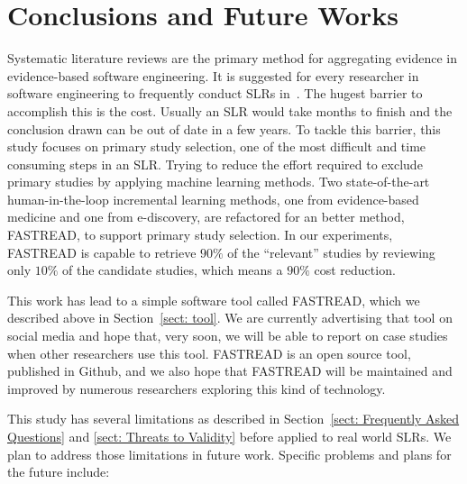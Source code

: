 \documentclass[final,twocolumn,5p]{elsarticle}
\theoremstyle{break}
\begin{document}
\section{Conclusions and Future Works}
\label{sect: Conclusion}

Systematic literature reviews are the primary method for aggregating evidence in evidence-based software engineering. It is suggested for every researcher in software engineering to frequently conduct SLRs in~\cite{keele2007guidelines}. The hugest barrier to accomplish this is the cost. Usually an SLR would take months to finish and the conclusion drawn can be out of date in a few years. To tackle this barrier, this study focuses on primary study selection, one of the most difficult and time consuming steps in an SLR. Trying to reduce the effort required to exclude primary studies by applying machine learning methods. Two state-of-the-art human-in-the-loop incremental learning methods, one from evidence-based medicine and one from e-discovery, are refactored for an better method, FASTREAD, to support primary study selection. In our experiments, FASTREAD is capable to retrieve $90\%$ of the ``relevant'' studies by reviewing only $10\%$ of the candidate studies, which means a $90\%$ cost reduction.

This work has lead to a simple software tool called FASTREAD, which
we described above in Section~\ref{sect: tool}. We are currently advertising
that tool on social media and hope that, very soon,
we will be  able to report on
case studies when other researchers use this tool. FASTREAD is
an open source tool, published in Github, and we also hope
that FASTREAD will be maintained and improved by numerous 
researchers exploring this kind of technology. 

This study has several limitations as described in Section~\ref{sect: Frequently Asked Questions} and \ref{sect: Threats to Validity} before applied to real world SLRs. We plan to address those limitations in future work. Specific problems and plans for the future include:
\end{document}

